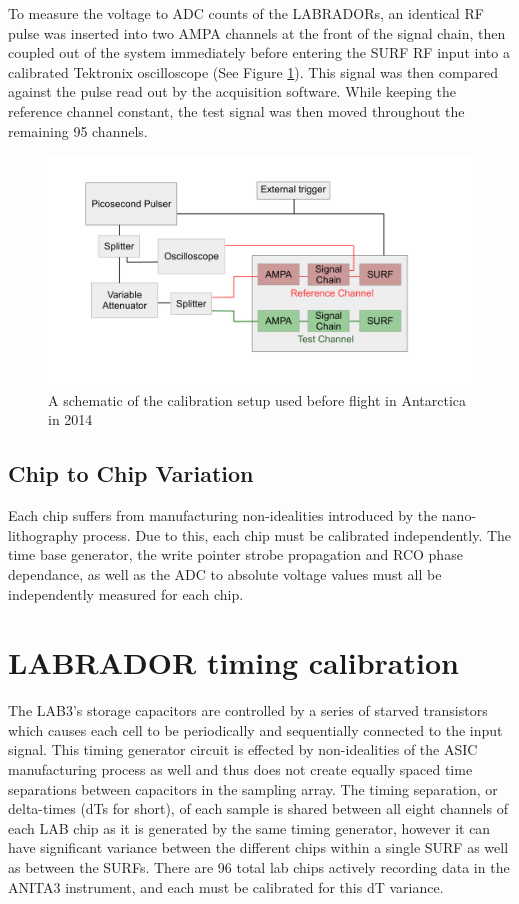 	To measure the voltage to ADC counts of the LABRADORs, an identical RF pulse was inserted into two AMPA channels at the front of the signal chain, then coupled out of the system immediately before entering the SURF RF input into a calibrated Tektronix oscilloscope (See Figure \ref{fig:calSetup}). This signal was then compared against the pulse read out by the acquisition software.  While keeping the reference channel constant, the test signal was then moved throughout the remaining 95 channels.
		
			
\begin{figure}
	\includegraphics[width=\textwidth]{figures/antarctica14_calSetup}
	\caption{A schematic of the calibration setup used before flight in Antarctica in 2014}
	\label{fig:calSetup}
\end{figure}
		
		
		
	\subsection{Chip to Chip Variation}
		Each chip suffers from manufacturing non-idealities introduced by the nano-lithography process.  Due to this, each chip must be calibrated independently.  The time base generator, the write pointer strobe propagation and RCO phase dependance, as well as the ADC to absolute voltage values must all be independently measured for each chip.



\section{LABRADOR timing calibration}
		The LAB3's storage capacitors are controlled by a series of starved transistors which causes each cell to be periodically and sequentially connected to the input signal.  This timing generator circuit is effected by non-idealities of the ASIC manufacturing process as well and thus does not create equally spaced time separations between capacitors in the sampling array.  The timing separation, or delta-times (dTs for short), of each sample is shared between all eight channels of each LAB chip as it is generated by the same timing generator, however it can have significant variance between the different chips within a single SURF as well as between the SURFs.  There are 96 total lab chips actively recording data in the ANITA3 instrument, and each must be calibrated for this dT variance.

